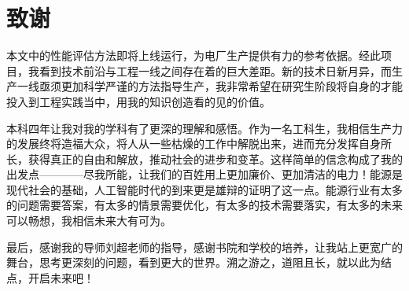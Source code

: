 \cleardoublepage
\chapter*{致谢}

本文中的性能评估方法即将上线运行，为电厂生产提供有力的参考依据。经此项目，我看到技术前沿与工程一线之间存在着的巨大差距。新的技术日新月异，而生产一线亟须更加科学严谨的方法指导生产，我非常希望在研究生阶段将自身的才能投入到工程实践当中，用我的知识创造看的见的价值。

本科四年让我对我的学科有了更深的理解和感悟。作为一名工科生，我相信生产力的发展终将造福大众，将人从一些枯燥的工作中解脱出来，进而充分发挥自身所长，获得真正的自由和解放，推动社会的进步和变革。这样简单的信念构成了我的出发点————尽我所能，让我们的百姓用上更加廉价、更加清洁的电力！能源是现代社会的基础，人工智能时代的到来更是雄辩的证明了这一点。能源行业有太多的问题需要答案，有太多的情景需要优化，有太多的技术需要落实，有太多的未来可以畅想，我相信未来大有可为。

最后，感谢我的导师刘超老师的指导，感谢书院和学校的培养，让我站上更宽广的舞台，思考更深刻的问题，看到更大的世界。溯之游之，道阻且长，就以此为结点，开启未来吧！
